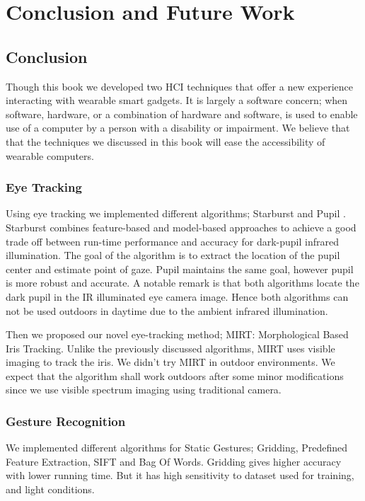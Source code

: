\chapter{Conclusion and Future Work} 
\label{ch_conclusion}

\section{Conclusion} 
Though this book we developed two HCI techniques that offer a new experience interacting with wearable smart gadgets.  It is largely a software concern; when software, hardware, or a combination of hardware and software, is used to enable use of a computer by a person with a disability or impairment. We believe that that the techniques we discussed in this book will ease the accessibility of wearable computers.

\subsection{Eye Tracking} 
Using eye tracking we implemented different algorithms; Starburst \cite{starburst} and Pupil \cite{pupil}. Starburst combines feature-based and model-based approaches to achieve a good trade off between run-time performance and accuracy for dark-pupil infrared illumination. The goal of the algorithm is to extract the location of the pupil center and estimate point of gaze. Pupil maintains the same goal, however pupil is more robust and accurate. A notable remark is that both algorithms locate the dark pupil in the IR illuminated eye camera image. Hence both algorithms can not be used outdoors in daytime due to the ambient infrared illumination. \bigskip

Then we proposed our novel eye-tracking method; MIRT: Morphological Based Iris Tracking. Unlike the previously discussed algorithms, MIRT uses visible imaging to track the iris. We didn't try MIRT in outdoor environments. We expect that the algorithm shall work outdoors after some minor modifications since we use visible spectrum imaging using traditional camera.


\subsection{Gesture Recognition} 
We implemented different algorithms for Static Gestures; Gridding, Predefined Feature Extraction, SIFT and Bag Of Words. Gridding gives higher accuracy with lower running time. But it has high sensitivity to dataset used for training, and light conditions.\bigskip

